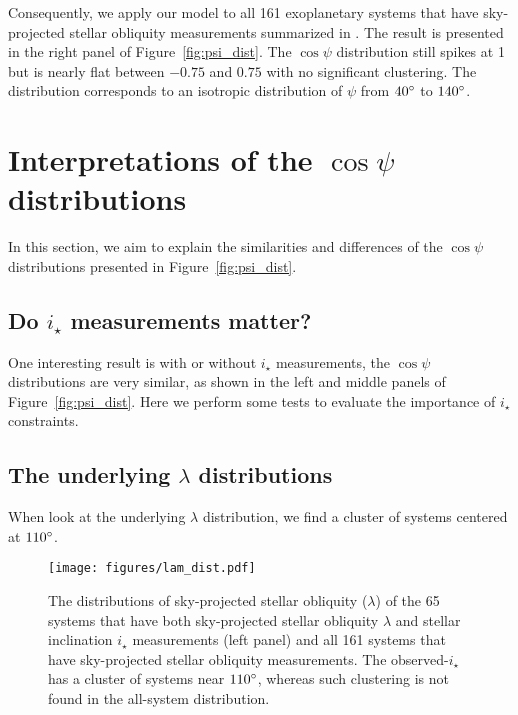 \documentclass[twocolumn,times]{aastex631}
\newcommand{\numistar}{65\xspace}
\newcommand{\numall}{161\xspace}
\begin{document}
Consequently, we apply our model to all \numall exoplanetary systems that have sky-projected stellar obliquity measurements summarized in \cite{Albrecht22}. The result is presented in the right panel of Figure~\ref{fig:psi_dist}. The $\cos{\psi}$ distribution still spikes at 1 but is nearly flat between $-0.75$ and $0.75$ with no significant clustering. The distribution corresponds to an isotropic distribution of $\psi$ from $40\mbox{$^\circ$}$ to $140\mbox{$^\circ$}$.

\section{Interpretations of the \texorpdfstring{$\cos{\psi}$}{cospsi} distributions}\label{sec:interpretations}

In this section, we aim to explain the similarities and differences of the $\cos{\psi}$ distributions presented in Figure~\ref{fig:psi_dist}.

\subsection{Do \texorpdfstring{$i_\star$}{istar} measurements matter?}
One interesting result is with or without $i_\star$ measurements, the $\cos{\psi}$ distributions are very similar, as shown in the left and middle panels of Figure~\ref{fig:psi_dist}. Here we perform some tests to evaluate the importance of $i_\star$ constraints.

\subsection{The underlying \texorpdfstring{$\lambda$}{lambda} distributions}

When look at the underlying $\lambda$ distribution, we find a cluster of systems centered at $110\mbox{$^\circ$}$.

\begin{figure*}[ht!]
    \begin{centering}
        \texttt{[image: figures/lam\_dist.pdf]}
        \caption{The distributions of sky-projected stellar obliquity ($\lambda$) of the \numistar systems that have both sky-projected stellar obliquity $\lambda$ and stellar inclination $i_\star$ measurements (left panel) and all \numall systems that have sky-projected stellar obliquity measurements. The observed-$i_\star$ has a cluster of systems near $110\mbox{$^\circ$}$, whereas such clustering is not found in the all-system distribution.}
        \label{fig:lam_dist}
    \end{centering}
\end{figure*}
\end{document}
